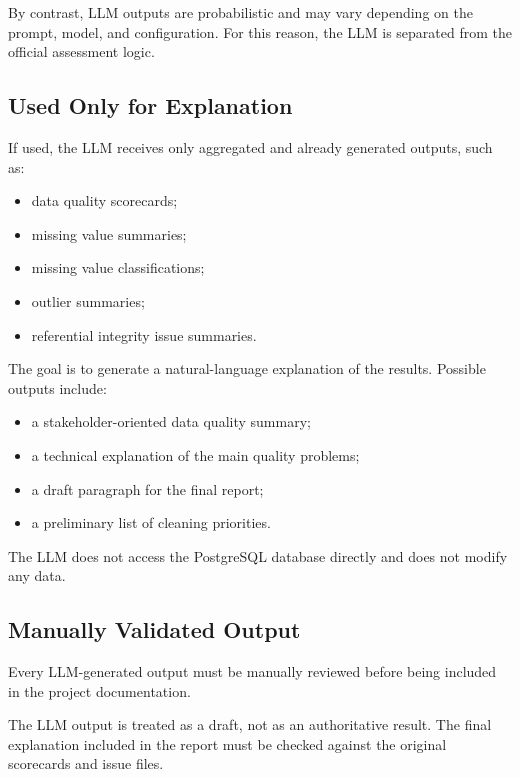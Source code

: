 \documentclass[a4paper,11pt]{article}
\begin{document}
	By contrast, LLM outputs are probabilistic and may vary depending on the prompt, model,
	and configuration. For this reason, the LLM is separated from the official assessment
	logic.
	
	\subsection{Used Only for Explanation}
	
	If used, the LLM receives only aggregated and already generated outputs, such as:
	
	\begin{itemize}
		\item data quality scorecards;
		\item missing value summaries;
		\item missing value classifications;
		\item outlier summaries;
		\item referential integrity issue summaries.
	\end{itemize}
	
	The goal is to generate a natural-language explanation of the results. Possible outputs
	include:
	
	\begin{itemize}
		\item a stakeholder-oriented data quality summary;
		\item a technical explanation of the main quality problems;
		\item a draft paragraph for the final report;
		\item a preliminary list of cleaning priorities.
	\end{itemize}
	
	The LLM does not access the PostgreSQL database directly and does not modify any data.
	
	\subsection{Manually Validated Output}
	
	Every LLM-generated output must be manually reviewed before being included in the
	project documentation.
	
	The LLM output is treated as a draft, not as an authoritative result. The final explanation
	included in the report must be checked against the original scorecards and issue files.
	
\end{document}

